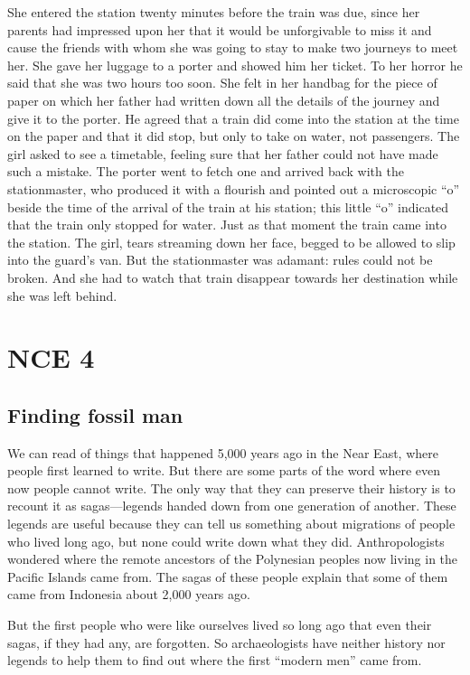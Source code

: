 \documentclass[11pt]{article}
\begin{document}
She entered the station twenty minutes before the train was due, since her parents had impressed upon her that it would be unforgivable to miss it and cause the friends with whom she was going to stay to make two journeys to meet her. She gave her luggage to a porter and showed him her ticket. To her horror he said that she was two hours too soon. She felt in her handbag for the piece of paper on which her father had written down all the details of the journey and give it to the porter. He agreed that a train did come into the station at the time on the paper and that it did stop, but only to take on water, not passengers. The girl asked to see a timetable, feeling sure that her father could not have made such a mistake. The porter went to fetch one and arrived back with the stationmaster, who produced it with a flourish and pointed out a microscopic ``o'' beside the time of the arrival of the train at his station; this little ``o'' indicated that the train only stopped for water. Just as that moment the train came into the station. The girl, tears streaming down her face, begged to be allowed to slip into the guard's van. But the stationmaster was adamant: rules could not be broken. And she had to watch that train disappear towards her destination while she was left behind.
\section{NCE 4}
\label{sec-2}
\subsection{Finding fossil man}
\label{sec-2-1}

We can read of things that happened 5,000 years ago in the Near East, where people first learned to write. But there are some parts of the word where even now people cannot write. The only way that they can preserve their history is to recount it as sagas---legends handed down from one generation of another. These legends are useful because they can tell us something about migrations of people who lived long ago, but none could write down what they did. Anthropologists wondered where the remote ancestors of the Polynesian peoples now living in the Pacific Islands came from. The sagas of these people explain that some of them came from Indonesia about 2,000 years ago.

But the first people who were like ourselves lived so long ago that even their sagas, if they had any, are forgotten. So archaeologists have neither history nor legends to help them to find out where the first ``modern men'' came from.
\end{document}
